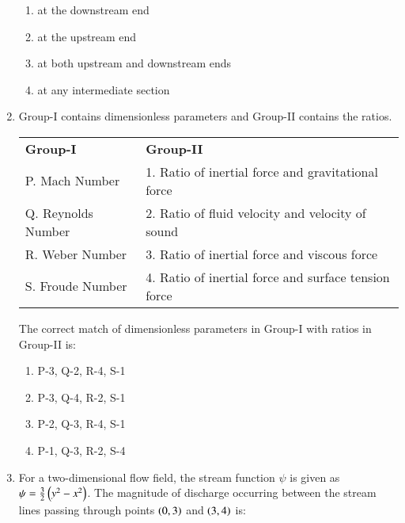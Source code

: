 \documentclass[journal,12pt,onecolumn]{IEEEtran}
\theoremstyle{remark}
\begin{document}
\begin{enumerate}
    \begin{multicols}{2}
    \begin{enumerate}
        \item at the downstream end
        \item at the upstream end
        \item at both upstream and downstream ends
        \item at any intermediate section
    \end{enumerate}
    \end{multicols}

    \item Group-I contains dimensionless parameters and Group-II contains the ratios.
    
    \begin{center}
    \begin{tabular}{p{6cm} p{9cm}}
        \textbf{Group-I} & \textbf{Group-II} \\

        P. Mach Number  & 1. Ratio of inertial force and gravitational force \\ 
        Q. Reynolds Number  & 2. Ratio of fluid velocity and velocity of sound \\
        R. Weber Number  & 3. Ratio of inertial force and viscous force \\ 
        S. Froude Number  & 4. Ratio of inertial force and surface tension force 
       
    \end{tabular}
\end{center}
    The correct match of dimensionless parameters in Group-I with ratios in Group-II is:
    
    \begin{multicols}{2}
    \begin{enumerate}
        \item P-3, Q-2, R-4, S-1
        \item P-3, Q-4, R-2, S-1
        \item P-2, Q-3, R-4, S-1
        \item P-1, Q-3, R-2, S-4
    \end{enumerate}
    \end{multicols}

    \item For a two-dimensional flow field, the stream function $\psi$ is given as $\psi = \frac{3}{2}\left( y^2 - x^2\right)$. The magnitude of discharge occurring between the stream lines passing through points $\left(0,3\right)$ and $\left(3,4\right)$ is:
    

\end{enumerate}
\end{document}
